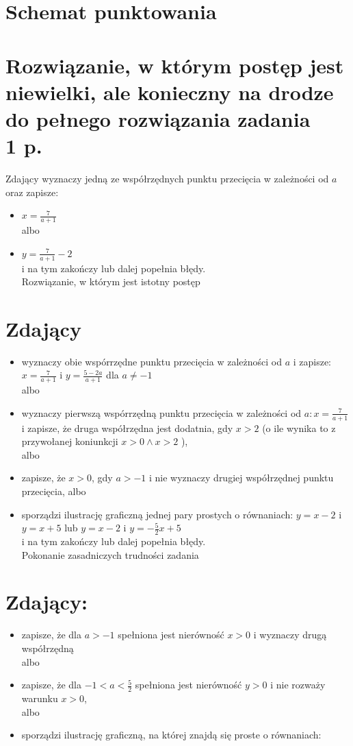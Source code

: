 \documentclass[10pt]{article}
\begin{document}
\section*{Schemat punktowania}
\section*{Rozwiązanie, w którym postęp jest niewielki, ale konieczny na drodze do pełnego rozwiązania zadania \\
 1 p.}
Zdający wyznaczy jedną ze współrzędnych punktu przecięcia w zależności od $a$ oraz zapisze:

\begin{itemize}
  \item $x=\frac{7}{a+1}$\\
albo
  \item $y=\frac{7}{a+1}-2$\\
i na tym zakończy lub dalej popełnia błędy.\\
Rozwiązanie, w którym jest istotny postęp
\end{itemize}

\section*{Zdający}
\begin{itemize}
  \item wyznaczy obie wspórrzędne punktu przecięcia w zależności od $a$ i zapisze: $x=\frac{7}{a+1}$ i $y=\frac{5-2 a}{a+1}$ dla $a \neq-1$\\
albo
  \item wyznaczy pierwszą wspórrzędną punktu przecięcia w zależności od $a: x=\frac{7}{a+1}$ i zapisze, że druga współrzędna jest dodatnia, gdy $x>2$ (o ile wynika to z przywołanej koniunkcji $x>0 \wedge x>2$ ),\\
albo
  \item zapisze, że $x>0$, gdy $a>-1$ i nie wyznaczy drugiej współrzędnej punktu przecięcia, albo
  \item sporządzi ilustrację graficzną jednej pary prostych o równaniach: $y=x-2$ i $y=x+5$ lub $y=x-2$ i $y=-\frac{5}{2} x+5$\\
i na tym zakończy lub dalej popełnia błędy.\\
Pokonanie zasadniczych trudności zadania
\end{itemize}

\section*{Zdający:}
\begin{itemize}
  \item zapisze, że dla $a>-1$ spełniona jest nierówność $x>0$ i wyznaczy drugą współrzędną\\
albo
  \item zapisze, że dla $-1<a<\frac{5}{2}$ spełniona jest nierówność $y>0$ i nie rozważy warunku $x>0$,\\
albo
  \item sporządzi ilustrację graficzną, na której znajdą się proste o równaniach:
\end{itemize}
\end{document}
